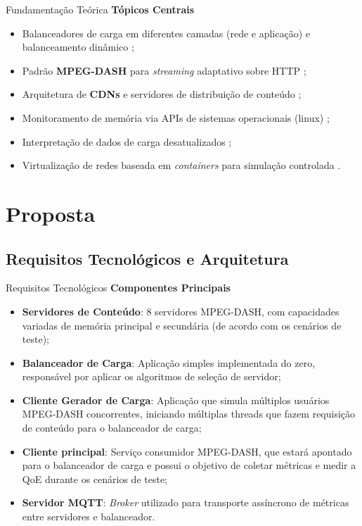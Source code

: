 \documentclass[10pt]{beamer}
\begin{document}
\begin{frame}{Fundamentação Teórica}
    \textbf{Tópicos Centrais}
    \begin{itemize}
        \item Balanceadores de carga em diferentes camadas (rede e aplicação) e balanceamento dinâmico \cite{scalabilityIssuesInDatabaseSystems, Pandian2022ICCBI};
        \item Padrão \textbf{MPEG-DASH} para \textit{streaming} adaptativo sobre HTTP \cite{thang2012adaptive, sodagar2011mpegdash, stockhammer2011dynamic};
        \item Arquitetura de \textbf{CDNs} e servidores de distribuição de conteúdo \cite{Preston2021Finding};
        \item Monitoramento de memória via APIs de sistemas operacionais (linux) \cite{linux_procfs_doc, linux_iostats_doc};
        \item Interpretação de dados de carga desatualizados \cite{interpretingStaleLoadInformation2000, adaptiveLoadSharing1986, analysisDelaysLoadSharing1989};
        \item Virtualização de redes baseada em \textit{containers} para simulação controlada \cite{aSurveyOfNetworkVirtualization2010}.
    \end{itemize}
\end{frame}


\section{Proposta}

\subsection{Requisitos Tecnológicos e Arquitetura}

\begin{frame}{Requisitos Tecnológicos}
    \textbf{Componentes Principais}
    \begin{itemize}
        \item \textbf{Servidores de Conteúdo}: 8 servidores MPEG-DASH, com capacidades variadas de memória principal e secundária (de acordo com os cenários de teste);
        \item \textbf{Balanceador de Carga}: Aplicação simples implementada do zero, responsável por aplicar os algoritmos de seleção de servidor;
        \item \textbf{Cliente Gerador de Carga}: Aplicação que simula múltiplos usuários MPEG-DASH concorrentes, iniciando múltiplas threads que fazem requisição de conteúdo para o balanceador de carga;
        \item \textbf{Cliente principal}: Serviço consumidor MPEG-DASH, que estará apontado para o balanceador de carga e possui o objetivo de coletar métricas e medir a QoE durante os cenários de teste;
        \item \textbf{Servidor MQTT}: \textit{Broker} utilizado para transporte assíncrono de métricas entre servidores e balanceador.
    \end{itemize}
\end{frame}
\end{document}
